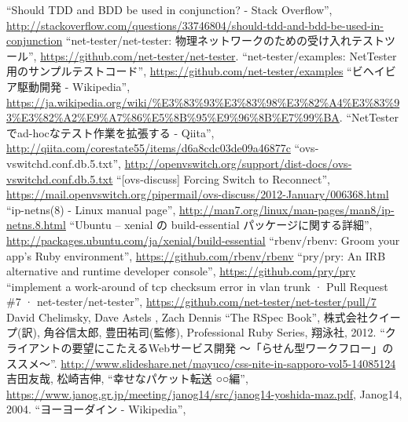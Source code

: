 \begin{thebibliography}{99}
         ``Should TDD and BDD be used in conjunction? - Stack Overflow'',
         \url{http://stackoverflow.com/questions/33746804/should-tdd-and-bdd-be-used-in-conjunction}
         ``net-tester/net-tester: 物理ネットワークのための受け入れテストツール'',
         \url{https://github.com/net-tester/net-tester}.
         ``net-tester/examples: NetTester用のサンプルテストコード'',
         \url{https://github.com/net-tester/examples}
         ``ビヘイビア駆動開発 - Wikipedia'',
         \url{https://ja.wikipedia.org/wiki/%E3%83%93%E3%83%98%E3%82%A4%E3%83%93%E3%82%A2%E9%A7%86%E5%8B%95%E9%96%8B%E7%99%BA}.
         ``NetTesterでad-hocなテスト作業を拡張する - Qiita'',
         \url{http://qiita.com/corestate55/items/d6a8cdc03de09a46877c}
         ``ovs-vswitchd.conf.db.5.txt'',
         \url{http://openvswitch.org/support/dist-docs/ovs-vswitchd.conf.db.5.txt}
         ``[ovs-discuss] Forcing Switch to Reconnect'',
         \url{https://mail.openvswitch.org/pipermail/ovs-discuss/2012-January/006368.html}
         ``ip-netns(8) - Linux manual page'',
         \url{http://man7.org/linux/man-pages/man8/ip-netns.8.html}
         ``Ubuntu – xenial の build-essential パッケージに関する詳細'',
         \url{http://packages.ubuntu.com/ja/xenial/build-essential}
         ``rbenv/rbenv: Groom your app’s Ruby environment'',
         \url{https://github.com/rbenv/rbenv}
         ``pry/pry: An IRB alternative and runtime developer console'',
         \url{https://github.com/pry/pry}
  ``implement a work-around of tcp checksum
         error in vlan trunk · Pull Request \#7 ·
         net-tester/net-tester'',
         \url{https://github.com/net-tester/net-tester/pull/7}
  David Chelimsky, Dave Astels , Zach Dennis ``The
         RSpec Book'', 株式会社クイープ(訳), 角谷信太郎, 豊田祐司(監修),
         Professional Ruby Series, 翔泳社, 2012.
         ``クライアントの要望にこたえるWebサービス開発 ～「らせん型ワークフロー」のススメ～''.
         \url{http://www.slideshare.net/mayuco/css-nite-in-sapporo-vol5-14085124}
         吉田友哉, 松崎吉伸,
         ``幸せなパケット転送 ○○編'',
         \url{https://www.janog.gr.jp/meeting/janog14/src/janog14-yoshida-maz.pdf},
         Janog14, 2004.
         ``ヨーヨーダイン - Wikipedia'',

\end{thebibliography}
